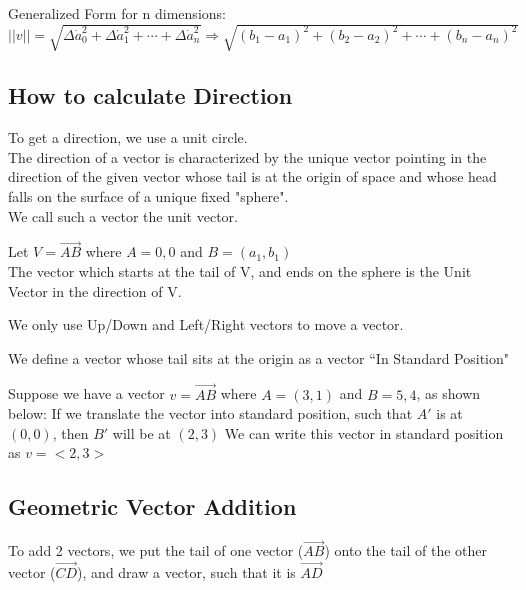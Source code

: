 \documentclass[]{article}
\begin{document}
    Generalized Form for n dimensions:\\
    $||v|| = \sqrt{\Delta\dot{a}_0^2 + \Delta\dot{a}_1^2 + \cdots + \Delta\dot{a}_n^2} \Rightarrow \sqrt{(b_1 - a_1)^2 + (b_2-a_2)^2 + \cdots + (b_n-a_n)^2}$

    \subsection*{How to calculate Direction}

    To get a direction, we use a unit circle.\\
    The direction of a vector is characterized by the unique vector pointing in the direction of the given vector whose tail is at the origin of space and whose head falls on the surface of a unique fixed "sphere". \\We call such a vector the unit vector. 

    Let $V = \overrightarrow{AB}$ where $A = {0, 0}$ and $B = (a_1, b_1)$\\
    The vector which starts at the tail of V, and ends on the sphere is the Unit Vector in the direction of V.

    We only use Up/Down and Left/Right vectors to move a vector.

    We define a vector whose tail sits at the origin as a vector ``In Standard Position"

    Suppose we have a vector $v = \overrightarrow{AB}$ where $A = (3, 1)$ and $B = 5, 4$, as shown below:
    If we translate the vector into standard position, such that $A'$ is at $(0, 0)$, then $B'$ will be at $(2, 3)$
    We can write this vector in standard position as $v = <2,3>$

    
    
    \subsection*{Geometric Vector Addition}
    To add 2 vectors, we put the tail of one vector ($\overrightarrow{AB}$) onto the tail of the other vector ($\overrightarrow{CD}$), and draw a vector, such that it is $\overrightarrow{AD}$\\
\end{document}
